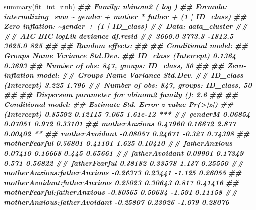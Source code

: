 \documentclass[
]{book}
\newenvironment{Shaded}{\begin{snugshade}}{\end{snugshade}}
\newcommand{\DocumentationTok}[1]{\textcolor[rgb]{0.56,0.35,0.01}{\textbf{\textit{#1}}}}
\newcommand{\FunctionTok}[1]{\textcolor[rgb]{0.00,0.00,0.00}{#1}}
\newcommand{\NormalTok}[1]{#1}
\begin{document}
\begin{Shaded}
\begin{Highlighting}[]
\FunctionTok{summary}\NormalTok{(fit\_int\_zinb)}
\DocumentationTok{\#\#  Family: nbinom2  ( log )}
\DocumentationTok{\#\# Formula:          internalizing\_sum \textasciitilde{} gender + mother * father + (1 | ID\_class)}
\DocumentationTok{\#\# Zero inflation:                     \textasciitilde{}gender + (1 | ID\_class)}
\DocumentationTok{\#\# Data: data\_cluster}
\DocumentationTok{\#\# }
\DocumentationTok{\#\#      AIC      BIC   logLik deviance df.resid }
\DocumentationTok{\#\#   3669.0   3773.3  {-}1812.5   3625.0      825 }
\DocumentationTok{\#\# }
\DocumentationTok{\#\# Random effects:}
\DocumentationTok{\#\# }
\DocumentationTok{\#\# Conditional model:}
\DocumentationTok{\#\#  Groups   Name        Variance Std.Dev.}
\DocumentationTok{\#\#  ID\_class (Intercept) 0.1364   0.3693  }
\DocumentationTok{\#\# Number of obs: 847, groups:  ID\_class, 50}
\DocumentationTok{\#\# }
\DocumentationTok{\#\# Zero{-}inflation model:}
\DocumentationTok{\#\#  Groups   Name        Variance Std.Dev.}
\DocumentationTok{\#\#  ID\_class (Intercept) 3.225    1.796   }
\DocumentationTok{\#\# Number of obs: 847, groups:  ID\_class, 50}
\DocumentationTok{\#\# }
\DocumentationTok{\#\# Dispersion parameter for nbinom2 family ():  2.6 }
\DocumentationTok{\#\# }
\DocumentationTok{\#\# Conditional model:}
\DocumentationTok{\#\#                               Estimate Std. Error z value Pr(\textgreater{}|z|)    }
\DocumentationTok{\#\# (Intercept)                    0.85592    0.12115   7.065 1.61e{-}12 ***}
\DocumentationTok{\#\# genderM                        0.06854    0.07051   0.972  0.33101    }
\DocumentationTok{\#\# motherAnxious                  0.47960    0.16672   2.877  0.00402 ** }
\DocumentationTok{\#\# motherAvoidant                {-}0.08057    0.24671  {-}0.327  0.74398    }
\DocumentationTok{\#\# motherFearful                  0.66801    0.41101   1.625  0.10410    }
\DocumentationTok{\#\# fatherAnxious                  0.07410    0.16668   0.445  0.65661    }
\DocumentationTok{\#\# fatherAvoidant                 0.09901    0.17349   0.571  0.56822    }
\DocumentationTok{\#\# fatherFearful                  0.38182    0.33578   1.137  0.25550    }
\DocumentationTok{\#\# motherAnxious:fatherAnxious   {-}0.26373    0.23441  {-}1.125  0.26055    }
\DocumentationTok{\#\# motherAvoidant:fatherAnxious   0.25023    0.30643   0.817  0.41416    }
\DocumentationTok{\#\# motherFearful:fatherAnxious   {-}0.80565    0.50634  {-}1.591  0.11158    }
\DocumentationTok{\#\# motherAnxious:fatherAvoidant  {-}0.25807    0.23926  {-}1.079  0.28076    }

\end{Highlighting}
\end{Shaded}
\end{document}
